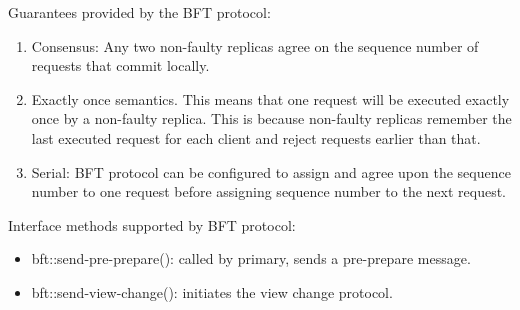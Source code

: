 \documentclass[twocolumn,10pt]{article}
\begin{document}
Guarantees provided by the BFT protocol:
\begin{enumerate}
\item{Consensus:} Any two non-faulty replicas
agree on the sequence number of requests that commit locally.
\item{Exactly once semantics.} This means that one request will be 
executed exactly once by a non-faulty replica. This is because non-faulty
replicas remember the last executed request for each client and reject requests
earlier than that.
\item{Serial:} BFT protocol can be configured to assign and agree
upon the sequence number to one request before assigning sequence number to the
next request.
\end{enumerate}

Interface methods supported by BFT protocol:
\begin{itemize}
\item{bft::send-pre-prepare()}: called by primary, sends a pre-prepare message. 
\item{bft::send-view-change()}: initiates the view change protocol.
\end{itemize}
\end{document}
